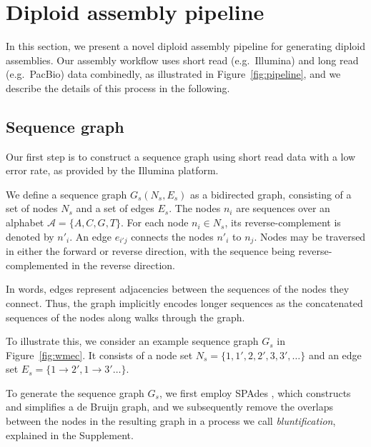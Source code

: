 \section{Diploid assembly pipeline}
In this section, we present a novel diploid assembly pipeline for generating diploid assemblies.
Our assembly workflow uses short read (e.g.\ Illumina) and long read (e.g.\ PacBio) data combinedly, as illustrated in Figure~\ref{fig:pipeline}, and we describe the details of this process in the following.

\subsection{Sequence graph} 
Our first step is to construct a sequence graph using short read data with a low error rate, as provided by the Illumina platform.
\begin{definition}
We define a sequence graph $G_s (N_s, E_s)$ as a bidirected graph, consisting of a set of nodes $N_s$ and a set of edges $E_s$.
The nodes $n_i$ are sequences over an alphabet $\mathcal{A} = \{A,C,G,T\}$.
For each node $n_i \in N_s$, its reverse-complement is denoted by $n'_i$.
An edge $e_{i'j}$ connects the nodes $n'_i$ to $n_j$. 
Nodes may be traversed in either the forward or reverse direction, with the sequence being reverse-complemented in the reverse direction. 
\end{definition}

In words, edges represent adjacencies between the sequences of the nodes they connect.
Thus, the graph implicitly encodes longer sequences as the concatenated sequences of the nodes along walks through the graph.

To illustrate this, we consider an example sequence graph $G_s$ in Figure~\ref{fig:wmec}. It consists of a node set $N_s = \{1, 1', 2, 2', 3, 3', \ldots\}$
and an edge set $E_s = \{1 \rightarrow 2', 1 \rightarrow 3' \ldots\}$.

To generate the sequence graph $G_s$, we first employ SPAdes \citep{bankevich2012spades}, which constructs and simplifies a de Bruijn graph, and we subsequently remove the overlaps between the nodes in the resulting graph in a process we call \textit{bluntification}, explained in the Supplement.

